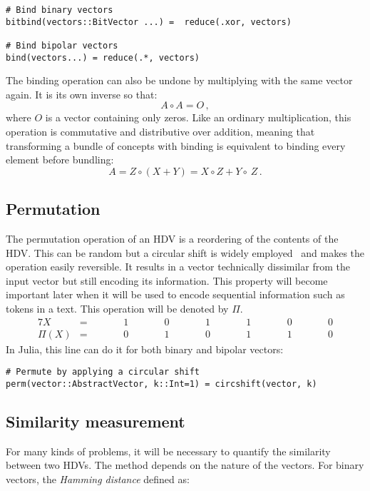 \begin{verbatim}
# Bind binary vectors
bitbind(vectors::BitVector ...) =  reduce(.xor, vectors)

# Bind bipolar vectors
bind(vectors...) = reduce(.*, vectors)
\end{verbatim}

The binding operation can also be undone by multiplying with the same vector again. It is its own inverse so that:
\begin{equation}
    \label{eqn:multpinv}
    A \circ A = O\,,
\end{equation}
where $O$ is a vector containing only zeros. Like an ordinary multiplication, this operation is commutative and distributive over addition, meaning that transforming a bundle of concepts with binding is equivalent to binding every element before bundling:
\begin{equation}
    \label{eqn:multpdis}
    A = Z \circ (X + Y) = X \circ Z + Y \circ\ Z\,.
\end{equation}
\subsection*{Permutation} \label{sssec:perm}
The permutation operation of an HDV is a reordering of the contents of the HDV. This can be random but a circular shift is widely employed~\cite{HD_rev} and makes the operation easily reversible. It results in a vector technically dissimilar from the input vector but still encoding its information. This property will become important later when it will be used to encode sequential information such as tokens in a text. This operation will be denoted by $\Pi$.
\begin{alignat*}{7}
    X &= && \qquad 1 && \qquad 0 && \qquad 1 && \qquad 1 && \qquad 0 && \qquad 0 \\
    \hline
    \Pi(X) &= && \qquad 0 && \qquad 1 && \qquad 0 &&  \qquad 1 && \qquad 1 && \qquad 0
\end{alignat*}
In Julia, this line can do it for both binary and bipolar vectors:

\begin{verbatim}
# Permute by applying a circular shift
perm(vector::AbstractVector, k::Int=1) = circshift(vector, k)
\end{verbatim}

\subsection*{Similarity measurement} \label{sssec:sim}
For many kinds of problems, it will be necessary to quantify the similarity between two HDVs. The method depends on the nature of the vectors. For binary vectors, the \textit{Hamming distance} defined as:

